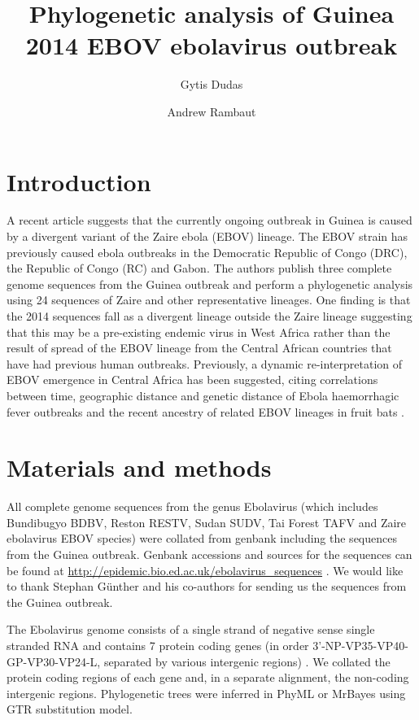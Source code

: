 \documentclass[11pt,oneside,letterpaper]{article}
\title{\vspace{1.0cm} \LARGE \bf Phylogenetic analysis of Guinea 2014 EBOV ebolavirus outbreak}
\author[1]{Gytis Dudas}
\author[1,2,3]{Andrew Rambaut}
\affil[1]{Institute of Evolutionary Biology, University of Edinburgh, Edinburgh, UK}
\affil[2]{Fogarty International Center, National Institutes of Health, Bethesda, MD, USA}
\affil[3]{Centre for Immunology, Infection and Evolution at the University of Edinburgh, Edinburgh, UK}
\begin{document}
\maketitle

\section*{Introduction}
A recent article \cite{baize2014} suggests that the currently ongoing outbreak in Guinea is caused by a divergent variant of the Zaire ebola (EBOV) lineage. The EBOV strain has previously caused ebola outbreaks in the Democratic Republic of Congo (DRC), the Republic of Congo (RC) and Gabon. The authors publish three complete genome sequences from the Guinea outbreak and perform a phylogenetic analysis using 24 sequences of Zaire and other representative lineages. One finding is that the 2014 sequences fall as a divergent lineage outside the Zaire lineage suggesting that this may be a pre-existing endemic virus in West Africa rather than the result of spread of the EBOV lineage from the Central African countries that have had previous human outbreaks.
Previously, a dynamic re-interpretation of EBOV emergence in Central Africa has been suggested, citing correlations between time, geographic distance and genetic distance of Ebola haemorrhagic fever outbreaks \cite{walsh2005} and the recent ancestry of related EBOV lineages in fruit bats \cite{biek2006}.

\section*{Materials and methods}
All complete genome sequences from the genus Ebolavirus (which includes Bundibugyo BDBV, Reston RESTV, Sudan SUDV, Tai Forest TAFV and Zaire ebolavirus EBOV species) were collated from genbank including the sequences from the Guinea outbreak.
Genbank accessions and sources for the sequences can be found at \url{http://epidemic.bio.ed.ac.uk/ebolavirus_sequences} .
We would like to thank Stephan G\"{u}nther and his co-authors for sending us the sequences from the Guinea outbreak. 

The Ebolavirus genome consists of a single strand of negative sense single stranded RNA and contains 7 protein coding genes (in order 3'-NP-VP35-VP40-GP-VP30-VP24-L, separated by various intergenic regions) \cite{sanchez1993}. We collated the protein coding regions of each gene and, in a separate alignment, the non-coding intergenic regions. Phylogenetic trees were inferred in PhyML \cite{guindon2003} or MrBayes \cite{huelsenbeck2001} using GTR \cite{tavare1986} substitution model.
\end{document}
